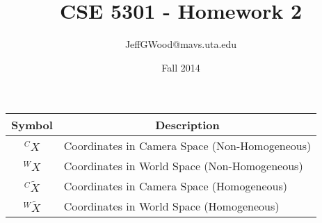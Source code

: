 \documentclass[a4paper,10pt]{article}
\title{CSE 5301 - Homework 2}
\author{JeffGWood@mavs.uta.edu}
\date{Fall 2014}
\begin{document}
\noindent

\begin{center}
\def\arraystretch{1.5}
\begin{tabular}{|c|l|}\hline
\multicolumn{1}{|c|}{\textbf{Symbol}} & \multicolumn{1}{|c|}{\textbf{Description}}
\\\hline
$^CX$ & Coordinates in Camera Space (Non-Homogeneous)\\\hline
$^WX$ & Coordinates in World Space (Non-Homogeneous)\\\hline
$^C\tilde{X} $ & Coordinates in Camera Space (Homogeneous)\\\hline
$^W\tilde{X} $ & Coordinates in World Space (Homogeneous)\\\hline
\end{tabular}\newline
\end{center}

\newpage
\noindent
\\
\end{document}
